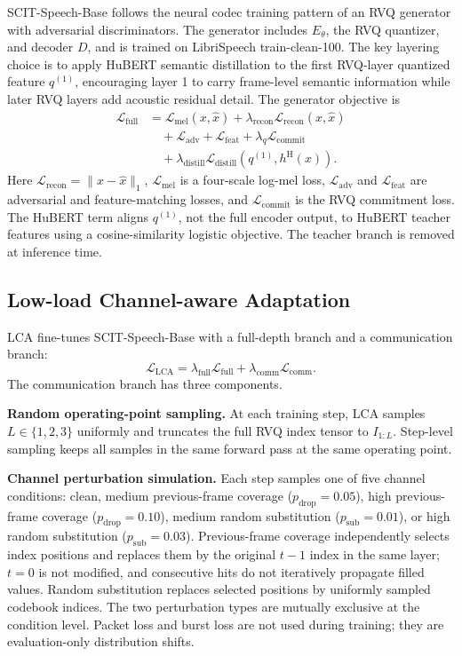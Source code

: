 \documentclass[10pt,twocolumn]{article}
\newcommand{\base}{SCIT-Speech-Base}
\begin{document}
\base{} follows the neural codec training pattern of an RVQ generator with adversarial discriminators. The generator includes \(E_\theta\), the RVQ quantizer, and decoder \(D\), and is trained on LibriSpeech train-clean-100. The key layering choice is to apply HuBERT semantic distillation to the first RVQ-layer quantized feature \(q^{(1)}\), encouraging layer 1 to carry frame-level semantic information while later RVQ layers add acoustic residual detail. The generator objective is
\[
\begin{split}
\mathcal{L}_{\mathrm{full}} &=
\mathcal{L}_{\mathrm{mel}}(x,\hat{x})
 + \lambda_{\mathrm{recon}}\mathcal{L}_{\mathrm{recon}}(x,\hat{x}) \\
&\quad + \mathcal{L}_{\mathrm{adv}} + \mathcal{L}_{\mathrm{feat}}
 + \lambda_q \mathcal{L}_{\mathrm{commit}} \\
&\quad + \lambda_{\mathrm{distill}}
 \mathcal{L}_{\mathrm{distill}}(q^{(1)},h^{\mathrm{H}}(x)).
\end{split}
\]
Here \(\mathcal{L}_{\mathrm{recon}}=\|x-\hat{x}\|_1\), \(\mathcal{L}_{\mathrm{mel}}\) is a four-scale log-mel loss, \(\mathcal{L}_{\mathrm{adv}}\) and \(\mathcal{L}_{\mathrm{feat}}\) are adversarial and feature-matching losses, and \(\mathcal{L}_{\mathrm{commit}}\) is the RVQ commitment loss. The HuBERT term aligns \(q^{(1)}\), not the full encoder output, to HuBERT teacher features using a cosine-similarity logistic objective. The teacher branch is removed at inference time.

\subsection{Low-load Channel-aware Adaptation}

LCA fine-tunes \base{} with a full-depth branch and a communication branch:
\[
\mathcal{L}_{\mathrm{LCA}} = \lambda_{\mathrm{full}}\mathcal{L}_{\mathrm{full}}
 + \lambda_{\mathrm{comm}}\mathcal{L}_{\mathrm{comm}}.
\]
The communication branch has three components.

\textbf{Random operating-point sampling.}
At each training step, LCA samples \(L\in\{1,2,3\}\) uniformly and truncates the full RVQ index tensor to \(I_{1:L}\). Step-level sampling keeps all samples in the same forward pass at the same operating point.

\textbf{Channel perturbation simulation.}
Each step samples one of five channel conditions: clean, medium previous-frame coverage (\(p_{\mathrm{drop}}=0.05\)), high previous-frame coverage (\(p_{\mathrm{drop}}=0.10\)), medium random substitution (\(p_{\mathrm{sub}}=0.01\)), or high random substitution (\(p_{\mathrm{sub}}=0.03\)). Previous-frame coverage independently selects index positions and replaces them by the original \(t-1\) index in the same layer; \(t=0\) is not modified, and consecutive hits do not iteratively propagate filled values. Random substitution replaces selected positions by uniformly sampled codebook indices. The two perturbation types are mutually exclusive at the condition level. Packet loss and burst loss are not used during training; they are evaluation-only distribution shifts.
\end{document}
